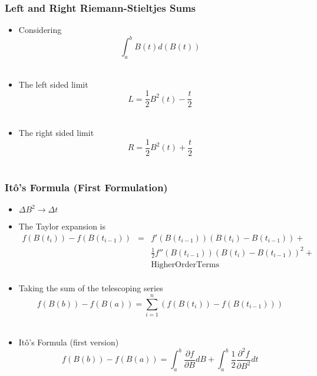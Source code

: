 \begin{frame}
  \frametitle{Left and Right Riemann-Stieltjes Sums}
  \begin{itemize}
  \item Considering $$\int_{a}^{b}{B(t)d(B(t))}$$\\
  \item The left sided limit \\
    $$L=\frac{1}{2}B^2(t)-\frac{t}{2}$$\\
  \item The right sided limit \\
    $$R=\frac{1}{2}B^2(t)+\frac{t}{2}$$\\
  \end{itemize}  
\end{frame}
  
\begin{frame}
  \frametitle{It\^{o}'s Formula (First Formulation)}
  \begin{itemize}
  \item $\Delta B^2 \to \Delta t$\\
  \item  The Taylor expansion is
  \begin{eqnarray*}
    f(B(t_i))-f(B(t_{i-1}))&=&f'(B(t_{i-1}))(B(t_i)-B(t_{i-1}))+\\
    & &\frac{1}{2}f''(B(t_{i-1}))(B(t_i)-B(t_{i-1}))^2+\\
    & &\mathrm{Higher Order Terms}\\
  \end{eqnarray*}
  \item Taking the sum of the telescoping series $$f(B(b))-f(B(a))=\sum_{i=1}^{n}(f(B(t_i))-f(B(t_{i-1})))$$\\
  \item It\^o's Formula (first version) $$f(B(b))-f(B(a))=\int_{a}^{b}{\frac{\partial f}{\partial B} dB}+\int_{a}^{b}{\frac{1}{2} \frac{\partial^2 f}{\partial B^2} dt} $$\\
  \end{itemize}
\end{frame}

